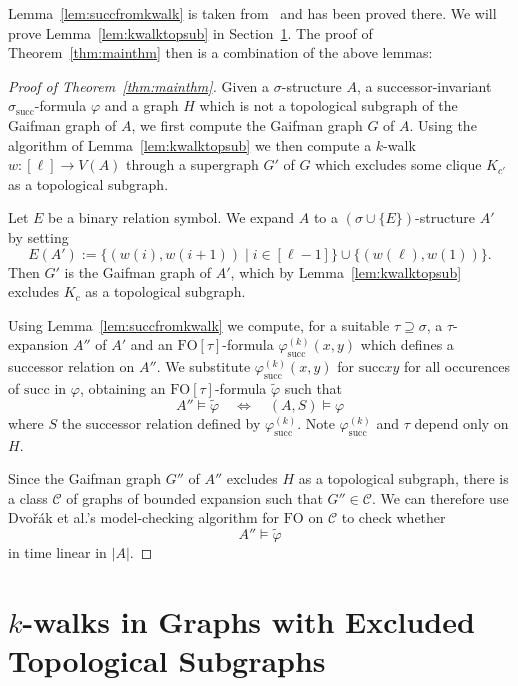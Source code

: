 \documentclass[12pt]{amsart}
\newcommand{\suchthat}{\mathbin |}
\newcommand{\absval}[1]{\left\vert #1 \right\vert}
\newcommand{\FO}{\textrm{FO}}
\newcommand{\CCC}{\mathcal{C}} \newcommand{\DDD}{\mathcal{D}}
\begin{document}
Lemma~\ref{lem:succfromkwalk} is taken from~\cite[Lemma~4.4]{ekk13}
and has been proved there. We will prove Lemma~\ref{lem:kwalktopsub}
in Section~\ref{sec:kwalktopsub}. The proof of
Theorem~\ref{thm:mainthm} then is a combination of the above lemmas:
\begin{proof}[Proof of Theorem~\ref{thm:mainthm}]
  Given a $\sigma$-structure $A$, a successor-invariant
  $\sigma_{\mathrm{succ}}$-formula $\varphi$ and a graph $H$ which is
  not a topological subgraph of the Gaifman graph of $A$, we first
  compute the Gaifman graph $G$ of $A$. Using the algorithm of
  Lemma~\ref{lem:kwalktopsub} we then compute a $k$-walk $w : [\ell]
  \to V(A)$ through a supergraph $G'$ of $G$ which excludes some
  clique $K_{c'}$ as a topological subgraph.

  Let $E$ be a binary relation symbol. We expand $A$ to a
  $(\sigma\cup\{E\})$-structure $A'$ by setting
  \[
  E(A') := \{ (w(i),w(i+1)) \suchthat i \in [\ell-1] \} \cup \{
  (w(\ell),w(1)) \}.
  \]
  Then $G'$ is the Gaifman graph of $A'$, which by
  Lemma~\ref{lem:kwalktopsub} excludes $K_c$ as a topological
  subgraph.

  Using Lemma~\ref{lem:succfromkwalk} we compute, for a suitable $\tau
  \supseteq \sigma$, a $\tau$-expansion $A''$ of $A'$ and an
  $\FO[\tau]$-formula $\varphi^{(k)}_{\mathrm{succ}}(x,y)$ which
  defines a successor relation on $A''$. We substitute
  $\varphi^{(k)}_{\mathrm{succ}}(x,y)$ for $\mathrm{succ}xy$ for all
  occurences of $\mathrm{succ}$ in $\varphi$, obtaining an
  $\FO[\tau]$-formula $\tilde\varphi$ such that
  \[
  A'' \models \tilde\varphi \quad\Leftrightarrow\quad
  (A,S) \models \varphi
  \]
  where $S$ the successor relation defined by
  $\varphi^{(k)}_{\mathrm{succ}}$. Note
  $\varphi^{(k)}_{\mathrm{succ}}$ and $\tau$ depend only on $H$.

  Since the Gaifman graph $G''$ of $A''$ excludes $H$ as a topological
  subgraph, there is a class $\CCC$ of graphs of bounded expansion
  such that $G'' \in \CCC$. We can therefore use {Dvo\v r\'ak} et
  al.'s model-checking algorithm for $\FO$ on $\CCC$ to check whether
  \[
  A'' \models \tilde\varphi
  \]
  in time linear in $\absval{A}$.
\end{proof}

\section{$k$-walks in Graphs with Excluded Topological Subgraphs}
\label{sec:kwalktopsub}
\end{document}
